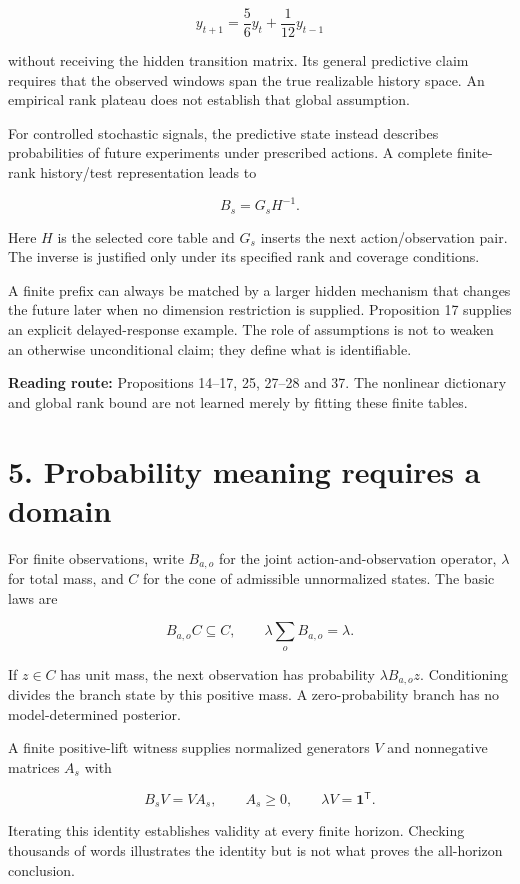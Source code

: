 \documentclass[11pt,letterpaper]{article}
\begin{document}
\[
y_{t+1}=\frac56y_t+\frac1{12}y_{t-1}
\]

without receiving the hidden transition matrix. Its general predictive
claim requires that the observed windows span the true realizable
history space. An empirical rank plateau does not establish that global
assumption.

For controlled stochastic signals, the predictive state instead
describes probabilities of future experiments under prescribed actions.
A complete finite-rank history/test representation leads to

\[
B_s=G_sH^{-1}.
\]

Here \(H\) is the selected core table and \(G_s\) inserts the next
action/observation pair. The inverse is justified only under its
specified rank and coverage conditions.

A finite prefix can always be matched by a larger hidden mechanism that
changes the future later when no dimension restriction is supplied.
Proposition 17 supplies an explicit delayed-response example. The role
of assumptions is not to weaken an otherwise unconditional claim; they
define what is identifiable.

\textbf{Reading route:} Propositions 14--17, 25, 27--28 and 37. The
nonlinear dictionary and global rank bound are not learned merely by
fitting these finite tables.

\section{5. Probability meaning requires a
domain}\label{probability-meaning-requires-a-domain}

For finite observations, write \(B_{a,o}\) for the joint
action-and-observation operator, \(\lambda\) for total mass, and \(C\)
for the cone of admissible unnormalized states. The basic laws are

\[
B_{a,o}C\subseteq C,\qquad
\lambda\sum_oB_{a,o}=\lambda.
\]

If \(z\in C\) has unit mass, the next observation has probability
\(\lambda B_{a,o}z\). Conditioning divides the branch state by this
positive mass. A zero-probability branch has no model-determined
posterior.

A finite positive-lift witness supplies normalized generators \(V\) and
nonnegative matrices \(A_s\) with

\[
B_sV=VA_s,\qquad A_s\geq0,\qquad \lambda V=\mathbf1^{\mathsf T}.
\]

Iterating this identity establishes validity at every finite horizon.
Checking thousands of words illustrates the identity but is not what
proves the all-horizon conclusion.
\end{document}
